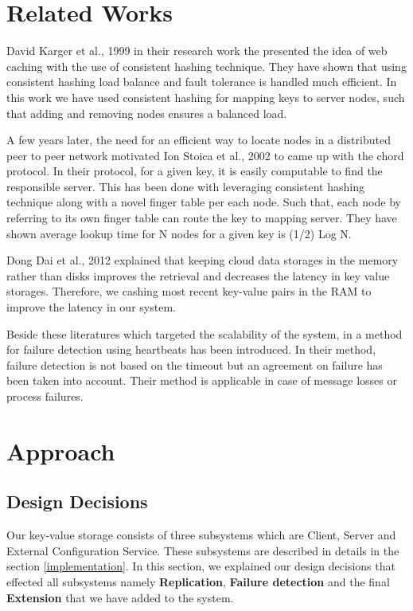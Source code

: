 \documentclass{sig-alternate}
\begin{document}
\section{Related Works}
David Karger et al., 1999 \cite{consistentHashing} in their research work the presented the idea of web caching with the use of consistent hashing technique. They have shown that using consistent hashing load  balance and fault tolerance is handled much efficient. 
In this work we have used consistent hashing for mapping keys to server nodes, such that adding and removing nodes ensures a balanced load.

A few years later, the need for an efficient way to locate nodes in a distributed peer to peer network motivated Ion Stoica et al., 2002 \cite{chord} to came up with the chord protocol. In their protocol, for a given key, it is easily computable to find the responsible server. This has been done with leveraging consistent hashing technique along with a novel finger table per each node. Such that, each node by referring to its own finger table can route the key to mapping server. They have shown average lookup time for N nodes for a given key is (1/2) Log N. 

Dong Dai et al., 2012 \cite{memory} explained that keeping cloud data storages in the memory rather than disks improves the retrieval and decreases the latency in key value storages. Therefore, we cashing most recent key-value pairs in the RAM to improve the latency in our system.

Beside these literatures which targeted the scalability of the system, in \cite{heartbeat} a method for failure detection using heartbeats has been introduced. In their method, failure detection is not based on the timeout  but an agreement on failure has been taken into account. Their method is applicable in case of message losses or process failures.


\section{Approach}
\subsection{Design Decisions}
Our key-value storage consists of three subsystems which are Client, Server and External Configuration Service. These subsystems are described in details in the section \ref{implementation}. In this section, we explained our design decisions that effected all subsystems namely  \textbf{Replication}, \textbf{Failure detection} and the final \textbf{Extension} that we have added to the system. 
\end{document}
